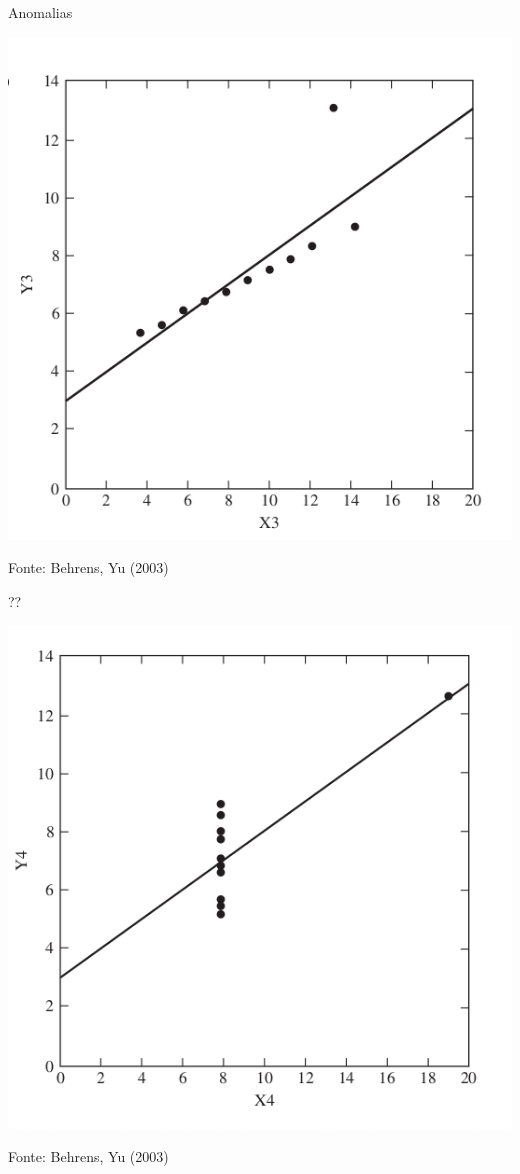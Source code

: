 \documentclass{beamer}
\begin{document}
\begin{frame}{Anomalias}
  \begin{center}
    \includegraphics[height=0.7\textheight]{EDA/eda-dispersao3}
  \end{center}

  \vfill
  \scriptsize
  \hfill Fonte: Behrens, Yu (2003)
\end{frame}

\begin{frame}{??}
  \begin{center}
    \includegraphics[height=0.7\textheight]{EDA/eda-dispersao4}
  \end{center}

  \vfill
  \scriptsize
  \hfill Fonte: Behrens, Yu (2003)
\end{frame}
\end{document}
